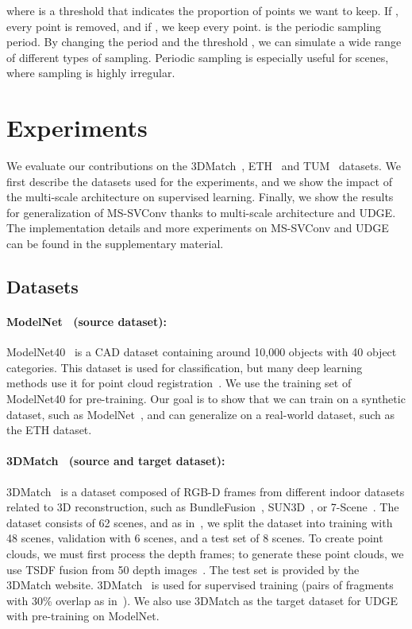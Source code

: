 \documentclass[10pt,twocolumn,letterpaper]{article}
\begin{document}
where  is a threshold that indicates the proportion of points we want to keep. If , every point is removed, and if , we keep every point.  is the periodic sampling period. By changing the period  and the threshold , we can simulate a wide range of different types of sampling.
Periodic sampling is especially useful for scenes, where sampling is highly irregular.



\section{Experiments}

We evaluate our contributions on the 3DMatch~\cite{zeng20163dmatch}, ETH~\cite{Pomerleau:2012} and TUM~\cite{sturm12iros} datasets. 
We first describe the datasets used for the experiments, and we show the impact of the multi-scale architecture on supervised learning. Finally, we show the results for generalization of MS-SVConv thanks to multi-scale architecture and UDGE. 
The implementation details and more experiments on MS-SVConv and UDGE can be found in the supplementary material.

\subsection{Datasets}
\paragraph{ModelNet~\cite{Wu_2015_CVPR} (source dataset):}

ModelNet40~\cite{Wu_2015_CVPR} is a CAD dataset containing around 10,000 objects with 40 object categories. This dataset is used for classification, but many deep learning methods use it for point cloud registration~\cite{Wang_2019_NeurIPS, aoki2019pointnetlk, wang2019deep}. We use the training set of ModelNet40 for pre-training. 
Our goal is to show that we can train on a synthetic dataset, such as ModelNet~\cite{Wu_2015_CVPR}, and can generalize on a real-world dataset, such as the ETH dataset.

\paragraph{3DMatch~\cite{zeng20163dmatch} (source and target dataset):}
3DMatch~\cite{zeng20163dmatch} is a dataset composed of RGB-D frames from different indoor datasets related to 3D reconstruction,
such as BundleFusion~\cite{dai2017bundlefusion}, SUN3D~\cite{HalberF2C17sun3D}, or 7-Scene~\cite{shotton20137scene}. The dataset consists of 62 scenes, and as in~\cite{choy2019fully}, we split the dataset into training with 48 scenes, validation with 6 scenes, and a test set of 8 scenes. 
To create point clouds, we must first process the depth frames; to generate these point clouds, we use TSDF fusion from 50 depth images~\cite{deng2018ppfnet, choy2019fully, bai2020d3feat, gojcic2018perfect}.
The test set is provided by the 3DMatch website. 3DMatch~\cite{zeng20163dmatch} is used for supervised training (pairs of fragments with 30\% overlap as in~\cite{gojcic2018perfect}). We also use 3DMatch as the target dataset for UDGE with pre-training on ModelNet.
\end{document}
